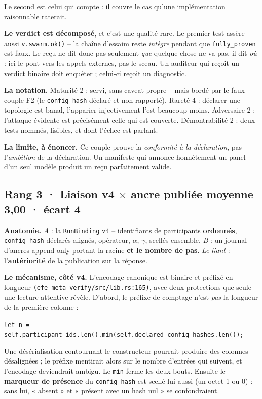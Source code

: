 \documentclass[10pt]{article}
\newcommand{\sz}[1]{{\small\color{grey}\textsf{#1}}}
\newcommand{\code}[1]{\texttt{\small #1}}
\newcommand{\x}{$\times$}
\newcommand{\loc}[1]{{\footnotesize\color{grey}\texttt{#1}}}
\newcommand{\couple}[4]{%
  \subsection{#1 · #2 \hfill {\normalsize\color{grey}moyenne \textbf{#3} · écart #4}}}
\begin{document}
Le second est celui qui compte : il couvre le cas qu'une implémentation raisonnable raterait.

\textbf{Le verdict est décomposé}, et c'est une qualité rare. Le premier test assère aussi
\code{v.swarm.ok()} -- la chaîne d'essaim reste \emph{intègre} pendant que \code{fully\_proven} est
faux. Le reçu ne dit donc pas seulement \emph{que} quelque chose ne va pas, il dit \emph{où} : ici le
pont vers les appels externes, pas le sceau. Un auditeur qui reçoit un verdict binaire doit enquêter ;
celui-ci reçoit un diagnostic.

\textbf{La notation.} \sz{Maturité 2} : servi, sans caveat propre -- mais bordé par le faux couple F2
\sz{(le \code{config\_hash} déclaré et non rapporté)}. \sz{Rareté 4} : déclarer une topologie est
banal, l'apparier injectivement l'est beaucoup moins. \sz{Adversaire 2} : l'attaque évidente est
précisément celle qui est couverte. \sz{Démontrabilité 2} : deux tests nommés, lisibles, et dont
l'échec est parlant.

\textbf{La limite, à énoncer.} Ce couple prouve la \emph{conformité à la déclaration}, pas
l'\emph{ambition} de la déclaration. Un manifeste qui annonce honnêtement un panel d'un seul modèle
produit un reçu parfaitement valide.

\couple{Rang 3}{Liaison v4 \x{} ancre publiée}{3,00}{4}

\textbf{Anatomie.} \emph{A} : la \code{RunBinding} v4 -- identifiants de participants \textbf{ordonnés},
\code{config\_hash} déclarés alignés, opérateur, $\alpha$, $\gamma$, scellés ensemble. \emph{B} : un
journal d'ancres append-only portant la racine \textbf{et le nombre de pas}. \emph{Le liant} :
l'\textbf{antériorité} de la publication sur la réponse.

\textbf{Le mécanisme, côté v4.} L'encodage canonique est binaire et préfixé en longueur
\loc{(efe-meta-verify/src/lib.rs:165)}, avec deux protections que seule une lecture attentive révèle.
D'abord, le préfixe de comptage n'est \emph{pas} la longueur de la première colonne :

\begin{extrait}\small
\code{let n = self.participant\_ids.len().min(self.declared\_config\_hashes.len());}
\end{extrait}

Une désérialisation contournant le constructeur pourrait produire des colonnes désalignées ; le
préfixe mentirait alors sur le nombre d'entrées qui suivent, et l'encodage deviendrait ambigu. Le
\code{min} ferme les deux bouts. Ensuite le \textbf{marqueur de présence} du \code{config\_hash}
est scellé lui aussi \sz{(un octet 1 ou 0)} : sans lui, « absent » et « présent avec un hash nul » se
confondraient.
\end{document}
